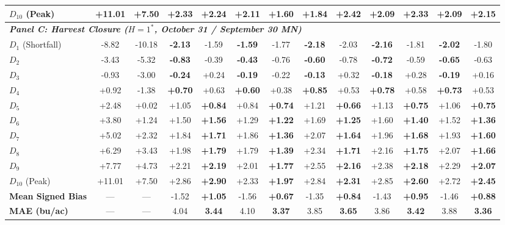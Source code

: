 \begin{table}[htbp]
\begin{tabular*}{\textwidth}{@{\extracolsep{\fill}} l cc cc cc cc cc cc @{}}
$D_{10}$ (Peak) & +11.01 & +7.50 & +2.33 & \textbf{+2.24} & +2.11 & \textbf{+1.60} & +1.84 & \textbf{+2.42} & +2.09 & \textbf{+2.33} & +2.09 & \textbf{+2.15} \\
\midrule
\multicolumn{13}{l}{\textit{\textbf{Panel C: Harvest Closure ($H = 1^*$, October 31 / September 30 MN)}}} \\
\midrule
$D_{1}$ (Shortfall) & -8.82 & -10.18 & \textbf{-2.13} & -1.59 & \textbf{-1.59} & -1.77 & \textbf{-2.18} & -2.03 & \textbf{-2.16} & -1.81 & \textbf{-2.02} & -1.80 \\
$D_{2}$ & -3.43 & -5.32 & \textbf{-0.83} & -0.39 & \textbf{-0.43} & -0.76 & \textbf{-0.60} & -0.78 & \textbf{-0.72} & -0.59 & \textbf{-0.65} & -0.63 \\
$D_{3}$ & -0.93 & -3.00 & \textbf{-0.24} & +0.24 & \textbf{-0.19} & -0.22 & \textbf{-0.13} & +0.32 & \textbf{-0.18} & +0.28 & \textbf{-0.19} & +0.16 \\
$D_{4}$ & +0.92 & -1.38 & \textbf{+0.70} & +0.63 & \textbf{+0.60} & +0.38 & \textbf{+0.85} & +0.53 & \textbf{+0.78} & +0.58 & \textbf{+0.73} & +0.53 \\
$D_{5}$ & +2.48 & +0.02 & +1.05 & \textbf{+0.84} & +0.84 & \textbf{+0.74} & +1.21 & \textbf{+0.66} & +1.13 & \textbf{+0.75} & +1.06 & \textbf{+0.75} \\
$D_{6}$ & +3.80 & +1.24 & +1.50 & \textbf{+1.56} & +1.29 & \textbf{+1.22} & +1.69 & \textbf{+1.25} & +1.60 & \textbf{+1.40} & +1.52 & \textbf{+1.36} \\
$D_{7}$ & +5.02 & +2.32 & +1.84 & \textbf{+1.71} & +1.86 & \textbf{+1.36} & +2.07 & \textbf{+1.64} & +1.96 & \textbf{+1.68} & +1.93 & \textbf{+1.60} \\
$D_{8}$ & +6.29 & +3.43 & +1.98 & \textbf{+1.79} & +1.79 & \textbf{+1.39} & +2.34 & \textbf{+1.71} & +2.16 & \textbf{+1.75} & +2.07 & \textbf{+1.66} \\
$D_{9}$ & +7.77 & +4.73 & +2.21 & \textbf{+2.19} & +2.01 & \textbf{+1.77} & +2.55 & \textbf{+2.16} & +2.38 & \textbf{+2.18} & +2.29 & \textbf{+2.07} \\
$D_{10}$ (Peak) & +11.01 & +7.50 & +2.86 & \textbf{+2.90} & +2.33 & \textbf{+1.97} & +2.84 & \textbf{+2.31} & +2.85 & \textbf{+2.60} & +2.72 & \textbf{+2.45} \\
\midrule
\textbf{Mean Signed Bias} & --- & --- & -1.52 & \textbf{+1.05} & -1.56 & \textbf{+0.67} & -1.35 & \textbf{+0.84} & -1.43 & \textbf{+0.95} & -1.46 & \textbf{+0.88} \\
\textbf{MAE (bu/ac)} & --- & --- & 4.04 & \textbf{3.44} & 4.10 & \textbf{3.37} & 3.85 & \textbf{3.65} & 3.86 & \textbf{3.42} & 3.88 & \textbf{3.36} \\

\end{tabular*}
\end{table}
